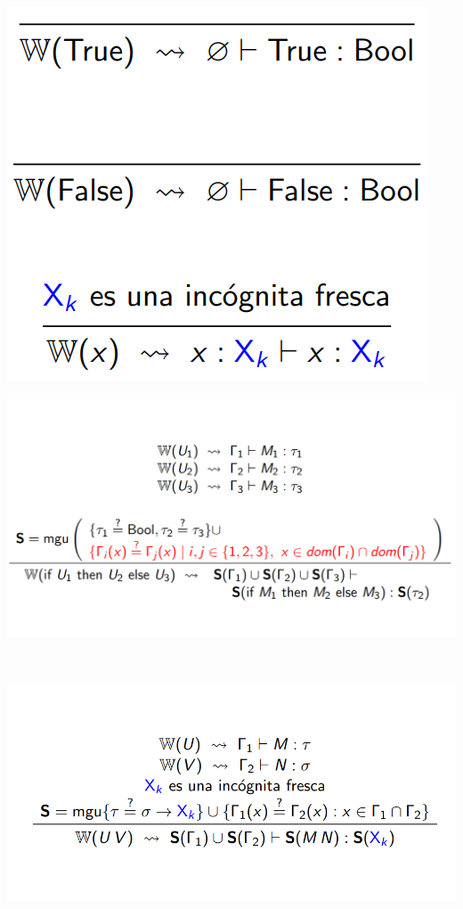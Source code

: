\documentclass[10pt,a4paper]{article}
\begin{document}
\begin{minipage}[b]{0.3\textwidth}
    \centering
    \includegraphics[width=\linewidth]{assets/inf_1.png}
\end{minipage}
\hfill
\begin{minipage}[b]{0.6\textwidth}
    \centering
    \includegraphics[width=\linewidth]{assets/inf_2.png}
\end{minipage} \\
\begin{minipage}[b]{0.5\textwidth}
    \centering
    \includegraphics[width=\linewidth]{assets/inf_3.png}
\end{minipage}
\end{document}
